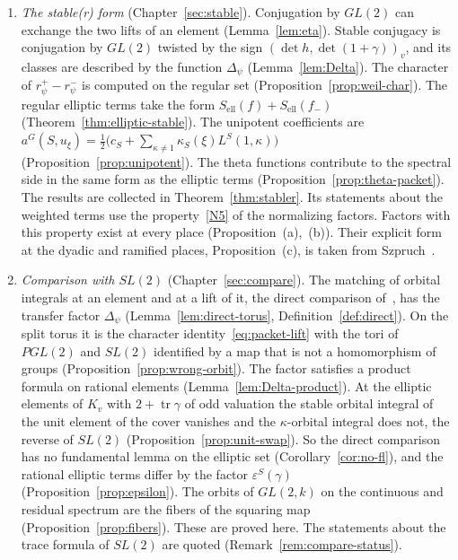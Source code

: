 \begin{enumerate}[label=\arabic*.]
  $M(w,0)=-1$ for every character fixed by the Weyl group
  (Proposition~\ref{prop:Mw0}). These are proved here, given the
  existence of normalizing factors, Theorem~\ref{thm:normalization}, which
  is taken from~\cite{Ar89,Li12a}.
\item \emph{The stable(r) form} (Chapter~\ref{sec:stable}). Conjugation
  by $GL(2)$ can exchange the two lifts of an element
  (Lemma~\ref{lem:eta}). Stable conjugacy is conjugation by $GL(2)$
  twisted by the sign $(\det h,\det(1+\gamma))_v$, and its classes are
  described by the function $\Delta_\psi$ (Lemma~\ref{lem:Delta}). The
  character of $r^+_\psi-r^-_\psi$ is computed on the regular set
  (Proposition~\ref{prop:weil-char}). The regular elliptic terms take the
  form $S_{\mathrm{ell}}(f)+S_{\mathrm{ell}}(f_-)$
  (Theorem~\ref{thm:elliptic-stable}). The unipotent coefficients are
  $a^G(S,u_\xi)=\frac12\bigl(c_S+\sum_{\kappa\ne1}\kappa_S(\xi)
  L^S(1,\kappa)\bigr)$ (Proposition~\ref{prop:unipotent}). The theta
  functions contribute to the spectral side in the same form as the
  elliptic terms (Proposition~\ref{prop:theta-packet}). The results are
  collected in Theorem~\ref{thm:stabler}. Its statements about the
  weighted terms use the property~\ref{N5} of the normalizing factors.
  Factors with this property exist at every place
  (Proposition~\normref{}(a),~(b)). Their explicit form at the dyadic and
  ramified places, Proposition~\normref{}(c), is taken from
  Szpruch~\cite{Sz09,Sz16}.
\item \emph{Comparison with $SL(2)$} (Chapter~\ref{sec:compare}). The
  matching of orbital integrals at an element and at a lift of it, the
  direct comparison of~\cite{JC26}, has the transfer factor $\Delta_\psi$
  (Lemma~\ref{lem:direct-torus}, Definition~\ref{def:direct}). On the
  split torus it is the character identity~\eqref{eq:packet-lift} with
  the tori of $PGL(2)$ and $SL(2)$ identified by a map that is not a
  homomorphism of groups (Proposition~\ref{prop:wrong-orbit}). The factor
  satisfies a product formula on rational elements
  (Lemma~\ref{lem:Delta-product}). At the elliptic elements of $K_v$ with
  $2+\operatorname{tr}\gamma$ of odd valuation the stable orbital integral
  of the unit element of the cover vanishes and the $\kappa$-orbital
  integral does not, the reverse of $SL(2)$
  (Proposition~\ref{prop:unit-swap}). So the direct comparison has no
  fundamental lemma on the elliptic set (Corollary~\ref{cor:no-fl}), and
  the rational elliptic terms differ by the factor $\varepsilon^S(\gamma)$
  (Proposition~\ref{prop:epsilon}). The orbits of $GL(2,k)$ on the
  continuous and residual spectrum are the fibers of the squaring map
  (Proposition~\ref{prop:fibers}). These are proved here. The statements
  about the trace formula of $SL(2)$ are quoted
  (Remark~\ref{rem:compare-status}).
\end{enumerate}

